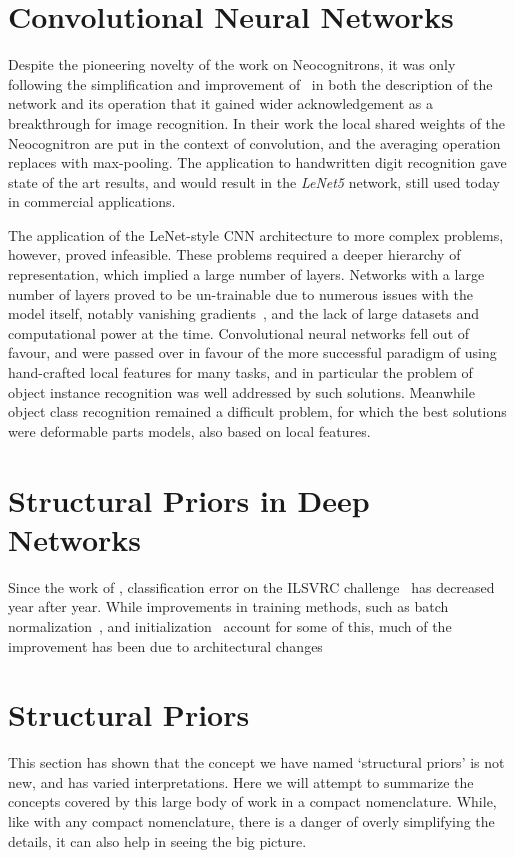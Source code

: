 \documentclass[thesis]{subfiles}
\begin{document}
	\section{Convolutional Neural Networks}
	
	Despite the pioneering novelty of the work on Neocognitrons, it was only following the simplification and improvement of~\citet{lecun1989backpropagation,Lecun1998} in both the description of the network and its operation that it gained wider acknowledgement as a breakthrough for image recognition. In their work the local shared weights of the Neocognitron are put in the context of convolution, and the averaging operation replaces with max-pooling. The application to handwritten digit recognition gave state of the art results, and would result in the \emph{LeNet5} network, still used today in commercial applications.
	
	The application of the LeNet-style CNN architecture to more complex problems, however, proved infeasible. These problems required a deeper hierarchy of representation, which implied a large number of layers. Networks with a large number of layers proved to be un-trainable due to numerous issues with the model itself, notably vanishing gradients~\citep{hochreiter1991untersuchungen}, and the lack of large datasets and computational power at the time. Convolutional neural networks fell out of favour, and were passed over in favour of the more successful paradigm of using hand-crafted local features for many tasks, and in particular the problem of object instance recognition was well addressed by such solutions. Meanwhile object class recognition remained a difficult problem, for which the best solutions were deformable parts models, also based on local features.
	
\section{Structural Priors in Deep Networks}
Since the work of \citet{Krizhevsky2012}, classification error on the ILSVRC challenge~\citep{ILSVRC2015} has decreased year after year. While improvements in training methods, such as batch normalization~\citep{Ioffe2015}, and initialization~\citep{He2015b} account for some of this, much of the improvement has been due to architectural changes
	\citep{Simonyan2014verydeep}
	\citep{He2015}
	\citep{He2016}


\section{Structural Priors}
    This section has shown that the concept we have named `structural priors' is not new, and has varied interpretations. Here we will attempt to summarize the concepts covered by this large body of work in a compact nomenclature. While, like with any compact nomenclature, there is a danger of overly simplifying the details, it can also help in seeing the big picture.
    
\end{document}
